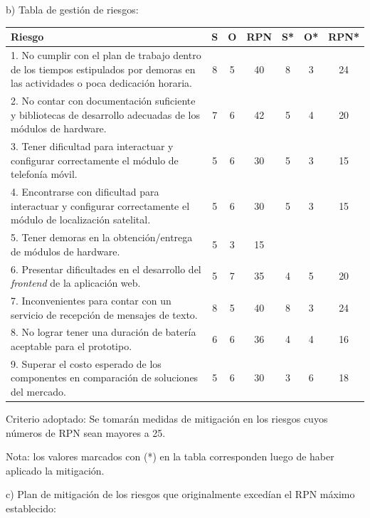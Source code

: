 \documentclass[
11pt, %
]{charter}
\begin{document}
b) Tabla de gestión de riesgos:

\begin{table}[htpb]
\centering
\begin{tabularx}{\linewidth}{@{}|X|c|c|c|c|c|c|@{}}
\hline
\rowcolor[HTML]{C0C0C0} 
Riesgo & S & O & RPN & S* & O* & RPN* \\ \hline
1. No cumplir con el plan de trabajo dentro de los tiempos estipulados por demoras en las actividades o poca dedicación horaria.       & 8  & 5  &  40   & 8  & 3  & 24   \\ \hline
2. No contar con documentación suficiente y bibliotecas de desarrollo adecuadas de los módulos de hardware.      & 7  & 6  &  42   & 5  & 4  & 20   \\ \hline
3. Tener dificultad para interactuar y configurar correctamente el módulo de telefonía móvil.       & 5  & 6  &  30   & 5  & 3  & 15   \\ \hline
4. Encontrarse con dificultad para interactuar y configurar correctamente el módulo de localización satelital.      & 5  & 6  &  30   & 5  & 3  & 15   \\ \hline
5. Tener demoras en la obtención/entrega de módulos de hardware.       & 5  & 3  &  15   &    &    &      \\ \hline
6. Presentar dificultades en el desarrollo del \textit{frontend} de la aplicación web.      & 5  & 7  &  35   & 4  & 5  & 20   \\ \hline
7. Inconvenientes para contar con un servicio de recepción de mensajes de texto.       & 8  & 5  &  40   & 8  & 3  & 24   \\ \hline
8. No lograr tener una duración de batería aceptable para el prototipo.       & 6  & 6  &  36   & 4  & 4  & 16   \\ \hline
9. Superar el costo esperado de los componentes en comparación de soluciones del mercado.     & 5  & 6  &  30   & 3  & 6  & 18   \\ \hline
\end{tabularx}%
\end{table}

Criterio adoptado: 
Se tomarán medidas de mitigación en los riesgos cuyos números de RPN sean mayores a 25.

Nota: los valores marcados con (*) en la tabla corresponden luego de haber aplicado la mitigación.

c) Plan de mitigación de los riesgos que originalmente excedían el RPN máximo establecido:
 
\end{document}
